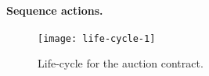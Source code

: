 \documentclass[runningheads]{llncs}
\begin{document}


\pagebreak
\paragraph{Sequence actions.}


\begin{figure}[h]
\center
\texttt{[image: life-cycle-1]}
\caption{Life-cycle for the auction contract.}
\label{fca1}
\end{figure} 

\end{document}
